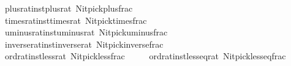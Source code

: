 \begin{isabellebody}
\ \ \ \ \ {\isacharparenleft}{\kern0pt}\isactrlconstUNDERSCOREname {\isasymopen}plus{\isacharunderscore}{\kern0pt}rat{\isacharunderscore}{\kern0pt}inst{\isachardot}{\kern0pt}plus{\isacharunderscore}{\kern0pt}rat{\isasymclose}{\isacharcomma}{\kern0pt}\ \isactrlconstUNDERSCOREname {\isasymopen}Nitpick{\isachardot}{\kern0pt}plus{\isacharunderscore}{\kern0pt}frac{\isasymclose}{\isacharparenright}{\kern0pt}{\isacharcomma}{\kern0pt}\isanewline
\ \ \ \ \ {\isacharparenleft}{\kern0pt}\isactrlconstUNDERSCOREname {\isasymopen}times{\isacharunderscore}{\kern0pt}rat{\isacharunderscore}{\kern0pt}inst{\isachardot}{\kern0pt}times{\isacharunderscore}{\kern0pt}rat{\isasymclose}{\isacharcomma}{\kern0pt}\ \isactrlconstUNDERSCOREname {\isasymopen}Nitpick{\isachardot}{\kern0pt}times{\isacharunderscore}{\kern0pt}frac{\isasymclose}{\isacharparenright}{\kern0pt}{\isacharcomma}{\kern0pt}\isanewline
\ \ \ \ \ {\isacharparenleft}{\kern0pt}\isactrlconstUNDERSCOREname {\isasymopen}uminus{\isacharunderscore}{\kern0pt}rat{\isacharunderscore}{\kern0pt}inst{\isachardot}{\kern0pt}uminus{\isacharunderscore}{\kern0pt}rat{\isasymclose}{\isacharcomma}{\kern0pt}\ \isactrlconstUNDERSCOREname {\isasymopen}Nitpick{\isachardot}{\kern0pt}uminus{\isacharunderscore}{\kern0pt}frac{\isasymclose}{\isacharparenright}{\kern0pt}{\isacharcomma}{\kern0pt}\isanewline
\ \ \ \ \ {\isacharparenleft}{\kern0pt}\isactrlconstUNDERSCOREname {\isasymopen}inverse{\isacharunderscore}{\kern0pt}rat{\isacharunderscore}{\kern0pt}inst{\isachardot}{\kern0pt}inverse{\isacharunderscore}{\kern0pt}rat{\isasymclose}{\isacharcomma}{\kern0pt}\ \isactrlconstUNDERSCOREname {\isasymopen}Nitpick{\isachardot}{\kern0pt}inverse{\isacharunderscore}{\kern0pt}frac{\isasymclose}{\isacharparenright}{\kern0pt}{\isacharcomma}{\kern0pt}\isanewline
\ \ \ \ \ {\isacharparenleft}{\kern0pt}\isactrlconstUNDERSCOREname {\isasymopen}ord{\isacharunderscore}{\kern0pt}rat{\isacharunderscore}{\kern0pt}inst{\isachardot}{\kern0pt}less{\isacharunderscore}{\kern0pt}rat{\isasymclose}{\isacharcomma}{\kern0pt}\ \isactrlconstUNDERSCOREname {\isasymopen}Nitpick{\isachardot}{\kern0pt}less{\isacharunderscore}{\kern0pt}frac{\isasymclose}{\isacharparenright}{\kern0pt}{\isacharcomma}{\kern0pt}\isanewline
\ \ \ \ \ {\isacharparenleft}{\kern0pt}\isactrlconstUNDERSCOREname {\isasymopen}ord{\isacharunderscore}{\kern0pt}rat{\isacharunderscore}{\kern0pt}inst{\isachardot}{\kern0pt}less{\isacharunderscore}{\kern0pt}eq{\isacharunderscore}{\kern0pt}rat{\isasymclose}{\isacharcomma}{\kern0pt}\ \isactrlconstUNDERSCOREname {\isasymopen}Nitpick{\isachardot}{\kern0pt}less{\isacharunderscore}{\kern0pt}eq{\isacharunderscore}{\kern0pt}frac{\isasymclose}{\isacharparenright}{\kern0pt}{\isacharcomma}{\kern0pt}\isanewline

\end{isabellebody}
